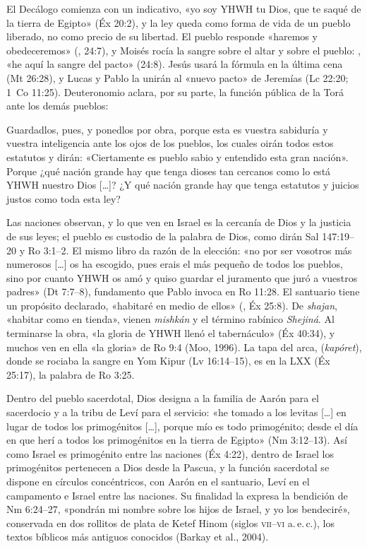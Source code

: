 El Decálogo comienza con un indicativo, «yo soy YHWH tu Dios, que te saqué de la tierra de Egipto» (Éx 20:2), y la ley queda como forma de vida de un pueblo liberado, no como precio de su libertad. El pueblo responde «haremos y obedeceremos» (, 24:7), y Moisés rocía la sangre sobre el altar y sobre el pueblo: , «he aquí la sangre del pacto» (24:8). Jesús usará la fórmula en la última cena (Mt 26:28), y Lucas y Pablo la unirán al «nuevo pacto» de Jeremías (Lc 22:20; 1~Co 11:25). Deuteronomio aclara, por su parte, la función pública de la Torá ante los demás pueblos:

\begin{cita}Guardadlos, pues, y ponedlos por obra, porque esta es vuestra sabiduría y vuestra inteligencia ante los ojos de los pueblos, los cuales oirán todos estos estatutos y dirán: «Ciertamente es pueblo sabio y entendido esta gran nación». Porque ¿qué nación grande hay que tenga dioses tan cercanos como lo está YHWH nuestro Dios [\ldots]? ¿Y qué nación grande hay que tenga estatutos y juicios justos como toda esta ley?\end{cita}

Las naciones observan, y lo que ven en Israel es la cercanía de Dios y la justicia de sus leyes; el pueblo es custodio de la palabra de Dios, como dirán Sal 147:19–20 y Ro 3:1–2. El mismo libro da razón de la elección: «no por ser vosotros más numerosos [\ldots] os ha escogido, pues erais el más pequeño de todos los pueblos, sino por cuanto YHWH os amó y quiso guardar el juramento que juró a vuestros padres» (Dt 7:7–8), fundamento que Pablo invoca en Ro 11:28. El santuario tiene un propósito declarado, «habitaré en medio de ellos» (, Éx 25:8). De \emph{shajan}, «habitar como en tienda», vienen \emph{mishkán} y el término rabínico \emph{Shejiná}. Al terminarse la obra, «la gloria de YHWH llenó el tabernáculo» (Éx 40:34), y muchos ven en ella «la gloria» de Ro 9:4 (Moo, 1996). La tapa del arca,  (\emph{kapóret}), donde se rociaba la sangre en Yom Kipur (Lv 16:14–15), es en la LXX  (Éx 25:17), la palabra de Ro 3:25.

Dentro del pueblo sacerdotal, Dios designa a la familia de Aarón para el sacerdocio y a la tribu de Leví para el servicio: «he tomado a los levitas [\ldots] en lugar de todos los primogénitos [\ldots], porque mío es todo primogénito; desde el día en que herí a todos los primogénitos en la tierra de Egipto» (Nm 3:12–13). Así como Israel es primogénito entre las naciones (Éx 4:22), dentro de Israel los primogénitos pertenecen a Dios desde la Pascua, y la función sacerdotal se dispone en círculos concéntricos, con Aarón en el santuario, Leví en el campamento e Israel entre las naciones. Su finalidad la expresa la bendición de Nm 6:24–27, «pondrán mi nombre sobre los hijos de Israel, y yo los bendeciré», conservada en dos rollitos de plata de Ketef Hinom (siglos \textsc{vii}–\textsc{vi} a.\,e.\,c.), los textos bíblicos más antiguos conocidos (Barkay et al., 2004).

